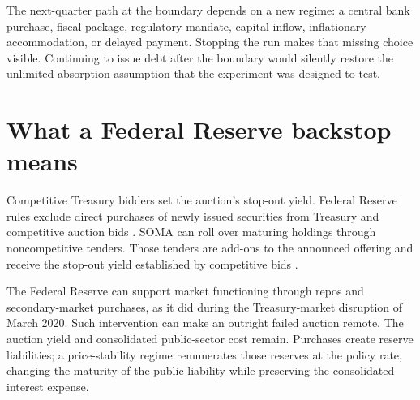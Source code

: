 \documentclass[11pt]{article}
\begin{document}
The next-quarter path at the boundary depends on a new regime: a central bank purchase,
fiscal package, regulatory mandate, capital inflow, inflationary accommodation, or delayed
payment.  Stopping the run makes that missing choice visible.
Continuing to issue debt after the boundary would silently restore the unlimited-absorption
assumption that the experiment was designed to test.

\section{What a Federal Reserve backstop means}

Competitive Treasury bidders set the auction's stop-out yield.  Federal Reserve rules exclude
direct purchases of newly issued securities from Treasury and competitive auction bids
\cite{fedTreasuryPurchases}.  SOMA can roll over maturing holdings through noncompetitive
tenders.  Those tenders are add-ons to the announced offering and receive the stop-out yield
established by competitive bids \cite{nyFedRollovers}.

The Federal Reserve can support market functioning through repos and secondary-market
purchases, as it did during the Treasury-market disruption of March 2020.  Such intervention
can make an outright failed auction remote.  The auction yield and consolidated public-sector
cost remain.  Purchases create reserve liabilities; a price-stability regime remunerates those
reserves at the policy rate, changing the maturity of the public liability while preserving
the consolidated interest expense.
\end{document}
